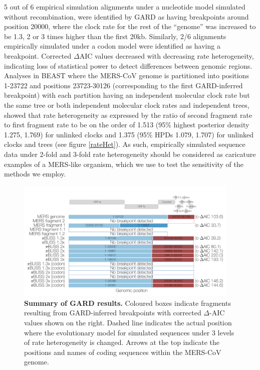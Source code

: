 \documentclass[11pt,oneside,letterpaper]{article}
\begin{document}
5 out of 6 empirical simulation alignments under a nucleotide model simulated without recombination, were identified by GARD as having breakpoints around position 20000, where the clock rate for the rest of the ``genome'' was increased to be 1.3, 2 or 3 times higher than the first 20kb.
Similarly, 2/6 alignments empirically simulated under a codon model were identified as having a breakpoint.
Corrected $\Delta$AIC values decreased with decreasing rate heterogeneity, indicating loss of statistical power to detect differences between genomic regions.
Analyses in BEAST where the MERS-CoV genome is partitioned into positions 1-23722 and positions 23723-30126 (corresponding to the first GARD-inferred breakpoint) with each partition having an independent molecular clock rate but the same tree or both independent molecular clock rates and independent trees, showed that rate heterogeneity as expressed by the ratio of second fragment rate to first fragment rate to be on the order of 1.513 (95\% highest posterior density 1.275, 1.769) for unlinked clocks and 1.375 (95\% HPDs 1.079, 1.707) for unlinked clocks and trees (see figure \ref{rateHet}).
As such, empirically simulated sequence data under 2-fold and 3-fold rate heterogeneity should be considered as caricature examples of a MERS-like organism, which we use to test the sensitivity of the methods we employ.

\begin{figure}[h]
	\centering
	\includegraphics[width=0.95\textwidth]{figures/MERS_GARD_summary.png}
	\caption{\textbf{Summary of GARD results.}
Coloured boxes indicate fragments resulting from GARD-inferred breakpoints with corrected $\Delta$-AIC values shown on the right.
Dashed line indicates the actual position where the evolutionary model for simulated sequences under 3 levels of rate heterogeneity is changed.
Arrows at the top indicate the positions and names of coding sequences within the MERS-CoV genome.}
	\label{gard}
\end{figure}
\end{document}

